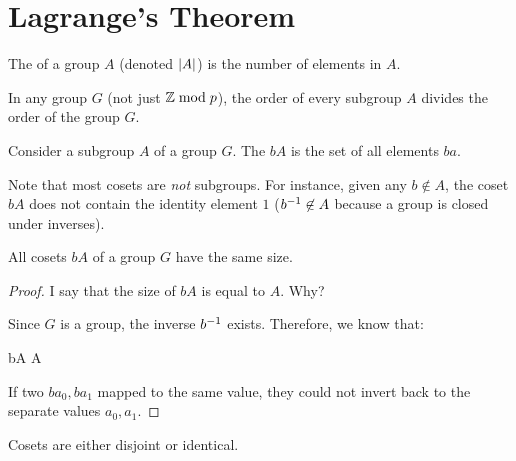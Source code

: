 \section{Lagrange's Theorem}

\begin{definition}
  The  of a group $A$ (denoted $|A|$) is the number
  of elements in $A$.
\end{definition}

\begin{theorem}
  In any group $G$ (not just $\mathbb{Z} \bmod p$), the order of every subgroup
  $A$ divides the order of the group $G$.
\end{theorem}

\begin{definition}
  Consider a subgroup $A$ of a group $G$. The  $bA$ is
  the set of all elements $ba$.

  Note that most cosets are \emph{not} subgroups. For instance, given
  any $b \not\in A$, the coset $bA$ does not contain the identity
  element $1$ (${b}^{-1} \not\in A$ because a group is closed under
  inverses).

\end{definition}

\begin{lemma}
  All cosets $bA$ of a group $G$ have the same size.
\end{lemma}

\begin{proof}
  I say that the size of $bA$ is equal to $A$. Why?

  Since $G$ is a group, the inverse ${b}^{-1}$ exists. Therefore, we know
  that:

  \begin{nedqn}
     bA
  \eqcol
    A
  \end{nedqn}

  If two $b a_0, b a_1$ mapped to the same value, they could not invert
  back to the separate values $a_0, a_1$.
\end{proof}

\begin{lemma}
  Cosets are either disjoint or identical.
\end{lemma}

